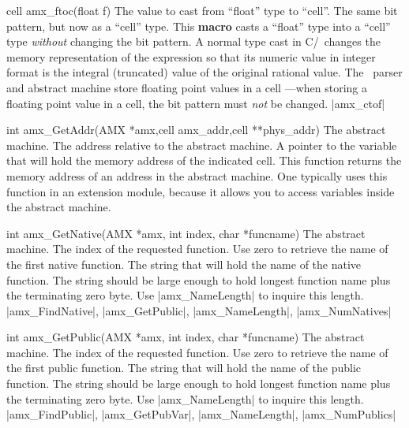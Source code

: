 \goodbreak
\syntaxp cell amx_ftoc(float f)
        The value to cast from ``float'' type to ``cell''.
\returns
    The same bit pattern, but now as a ``cell'' type.
\notes
    This {\bf macro} casts a ``float'' type into a ``cell'' type {\it without\/}
    changing the bit pattern. A normal type cast in C/\Cpp\ changes the memory
    representation of the expression so that its numeric value in integer
    format is the integral (truncated) value of the original rational value.
    The \Small\ parser and abstract machine store floating point values in a
    cell ---when storing a floating point value in a cell, the bit pattern must
    {\it not\/} be changed.
\seealso |amx_ctof|

\goodbreak
\syntaxp int amx_GetAddr(AMX *amx,cell amx_addr,cell **phys_addr)
        The abstract machine.
        The address relative to the abstract machine.
        A pointer to the variable that will hold the memory address
        of the indicated cell.
\notes
    This function returns the memory address of an address in the abstract
    machine. One typically uses this function in an extension module, because
    it allows you to access variables inside the abstract machine.

\goodbreak
\syntaxp int amx_GetNative(AMX *amx, int index, char *funcname)
        The abstract machine.
        The index of the requested function. Use zero to retrieve the name of
        the first native function.
        The string that will hold the name of the native function.
\notes
    The string should be large enough to hold longest function name plus the
    terminating zero byte. Use |amx_NameLength| to inquire this length.
\seealso
    |amx_FindNative|, |amx_GetPublic|, |amx_NameLength|, \lbreak
    |amx_NumNatives|

\goodbreak
\syntaxp int amx_GetPublic(AMX *amx, int index, char *funcname)
        The abstract machine.
        The index of the requested function. Use zero to retrieve the name of
        the first public function.
        The string that will hold the name of the public function.
\notes
    The string should be large enough to hold longest function name plus the
    terminating zero byte. Use |amx_NameLength| to inquire this length.
\seealso
    |amx_FindPublic|, |amx_GetPubVar|, |amx_NameLength|, \lbreak
    |amx_NumPublics|

